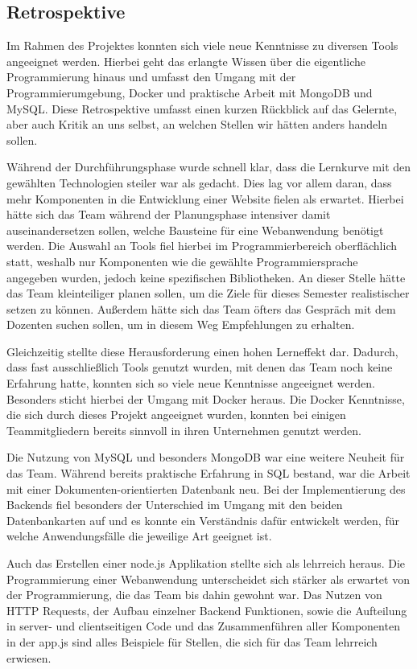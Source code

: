 \subsection{Retrospektive}\label{subsec:retrospektive}

Im Rahmen des Projektes konnten sich viele neue Kenntnisse zu diversen Tools angeeignet werden.
Hierbei geht das erlangte Wissen über die eigentliche Programmierung hinaus und umfasst den Umgang mit der Programmierumgebung, Docker und praktische Arbeit mit MongoDB und MySQL.
Diese Retrospektive umfasst einen kurzen Rückblick auf das Gelernte, aber auch Kritik an uns selbst, an welchen Stellen wir hätten anders handeln sollen.

Während der Durchführungsphase wurde schnell klar, dass die Lernkurve mit den gewählten Technologien steiler war als gedacht.
Dies lag vor allem daran, dass mehr Komponenten in die Entwicklung einer Website fielen als erwartet.
Hierbei hätte sich das Team während der Planungsphase intensiver damit auseinandersetzen sollen, welche Bausteine für eine Webanwendung benötigt werden.
Die Auswahl an Tools fiel hierbei im Programmierbereich oberflächlich statt, weshalb nur Komponenten wie die gewählte Programmiersprache angegeben wurden, jedoch keine spezifischen Bibliotheken.
An dieser Stelle hätte das Team kleinteiliger planen sollen, um die Ziele für dieses Semester realistischer setzen zu können.
Außerdem hätte sich das Team öfters das Gespräch mit dem Dozenten suchen sollen, um in diesem Weg Empfehlungen zu erhalten.

Gleichzeitig stellte diese Herausforderung einen hohen Lerneffekt dar.
Dadurch, dass fast ausschließlich Tools genutzt wurden, mit denen das Team noch keine Erfahrung hatte, konnten sich so viele neue Kenntnisse angeeignet werden.
Besonders sticht hierbei der Umgang mit Docker heraus.
Die Docker Kenntnisse, die sich durch dieses Projekt angeeignet wurden, konnten bei einigen Teammitgliedern bereits sinnvoll in ihren Unternehmen genutzt werden.

Die Nutzung von MySQL und besonders MongoDB war eine weitere Neuheit für das Team.
Während bereits praktische Erfahrung in SQL bestand, war die Arbeit mit einer Dokumenten-orientierten Datenbank neu.
Bei der Implementierung des Backends fiel besonders der Unterschied im Umgang mit den beiden Datenbankarten auf und es konnte ein Verständnis dafür entwickelt werden, für welche Anwendungsfälle die jeweilige Art geeignet ist.

Auch das Erstellen einer node.js Applikation stellte sich als lehrreich heraus.
Die Programmierung einer Webanwendung unterscheidet sich stärker als erwartet von der Programmierung, die das Team bis dahin gewohnt war.
Das Nutzen von HTTP Requests, der Aufbau einzelner Backend Funktionen, sowie die Aufteilung in server- und clientseitigen Code und das Zusammenführen aller Komponenten in der app.js sind alles Beispiele für Stellen, die sich für das Team lehrreich erwiesen.

